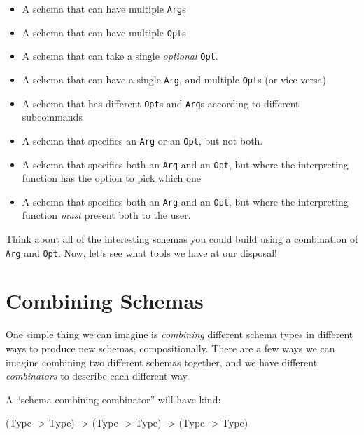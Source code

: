 \documentclass[]{article}
\newenvironment{Shaded}{}{}
\newcommand{\DataTypeTok}[1]{\textcolor[rgb]{0.56,0.13,0.00}{#1}}
\newcommand{\NormalTok}[1]{#1}
\newcommand{\OtherTok}[1]{\textcolor[rgb]{0.00,0.44,0.13}{#1}}
\begin{document}
\begin{itemize}
\item
  A schema that can have multiple \texttt{Arg}s
\item
  A schema that can have multiple \texttt{Opt}s
\item
  A schema that can take a single \emph{optional} \texttt{Opt}.
\item
  A schema that can have a single \texttt{Arg}, and multiple \texttt{Opt}s (or
  vice versa)
\item
  A schema that has different \texttt{Opt}s and \texttt{Arg}s according to
  different subcommands
\item
  A schema that specifies an \texttt{Arg} or an \texttt{Opt}, but not both.
\item
  A schema that specifies both an \texttt{Arg} and an \texttt{Opt}, but where
  the interpreting function has the option to pick which one
\item
  A schema that specifies both an \texttt{Arg} and an \texttt{Opt}, but where
  the interpreting function \emph{must} present both to the user.
\end{itemize}

Think about all of the interesting schemas you could build using a combination
of \texttt{Arg} and \texttt{Opt}. Now, let's see what tools we have at our
disposal!

\hypertarget{combining-schemas}{%
\section{Combining Schemas}\label{combining-schemas}}

One simple thing we can imagine is \emph{combining} different schema types in
different ways to produce new schemas, compositionally. There are a few ways we
can imagine combining two different schemas together, and we have different
\emph{combinators} to describe each different way.

A ``schema-combining combinator'' will have kind:

\begin{Shaded}
\begin{Highlighting}[]
\NormalTok{(}\DataTypeTok{Type} \OtherTok{->} \DataTypeTok{Type}\NormalTok{) }\OtherTok{->}\NormalTok{ (}\DataTypeTok{Type} \OtherTok{->} \DataTypeTok{Type}\NormalTok{) }\OtherTok{->}\NormalTok{ (}\DataTypeTok{Type} \OtherTok{->} \DataTypeTok{Type}\NormalTok{)}
\end{Highlighting}
\end{Shaded}
\end{document}
